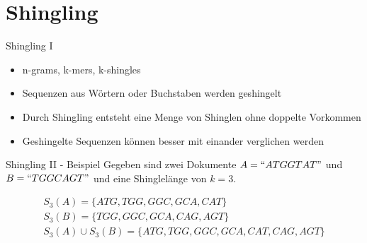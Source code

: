 \section{Shingling}

\begin{frame}{Shingling I}
    \begin{itemize}
        \item n-grams, k-mers, k-shingles \pause
        \item Sequenzen aus Wörtern oder Buchstaben werden geshingelt \pause
        \item Durch Shingling entsteht eine Menge von Shinglen ohne doppelte Vorkommen \pause
        \item Geshingelte Sequenzen können besser mit einander verglichen werden
    \end{itemize}
\end{frame}


\begin{frame}{Shingling II - Beispiel}
    Gegeben sind zwei Dokumente $ A = ``ATGGTAT" $ und $ B = ``TGGCAGT" $ und eine Shinglelänge von $ k = 3 $. \pause
    
    \begin{example}
        \begin{equation*}
            \begin{split}
                S_3(A) = \{ATG, TGG, GGC, GCA, CAT\} \\
                S_3(B) = \{TGG, GGC, GCA, CAG, AGT\} \\
                S_3(A) \cup S_3(B) = \{ATG, TGG, GGC, GCA, CAT, CAG, AGT\}
            \end{split}
        \end{equation*}
    \end{example}
\end{frame}